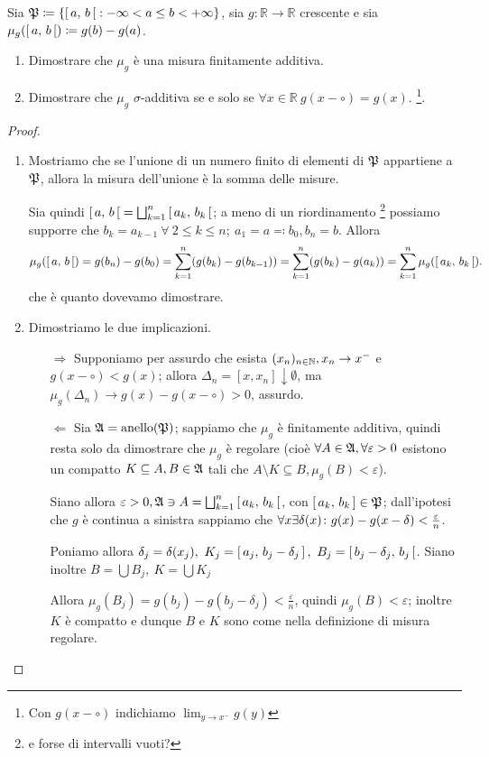 \documentclass[../EserciziIstituzioniAnalisi.tex]{subfiles}
\begin{document}
\begin{exercise}[2016-10-14]
  Sia $\mathfrak P \coloneqq \left\lbrace \left[\,a,\,b\,\right[: -\infty < a \leq b < +\infty\right\rbrace$, sia $g\colon \mathbb{R} \to \mathbb{R}$ crescente e sia $\mu_g(\left[\,a,\,b\,\right[) \coloneqq g(b) - g(a)$.
  \begin{enumerate}
    \item Dimostrare che $\mu_g$ è una misura finitamente additiva.
    \item Dimostrare che $\mu_g$ $\sigma$-additiva se e solo se $\forall x \in \mathbb{R}\ g(x-\circ) = g(x)$. \footnote{Con $g(x-\circ)$ indichiamo $\lim_{y\to x^{-}}g(y)$}.
  \end{enumerate}
\end{exercise}
\begin{proof}
  \begin{enumerate}
    \item Mostriamo che se l'unione di un numero finito di elementi di $\mathfrak P$ appartiene a $\mathfrak P$, allora la misura dell'unione è la somma delle misure.

    Sia quindi $\left[\,a,\,b\,\right[=\bigsqcup_{k=1}^{n}\left[\,a_k,\,b_k\,\right[$; a meno di un riordinamento \footnote{e forse di intervalli vuoti?} possiamo supporre che
    $b_k=a_{k-1}\ \forall\ 2\leq k\leq n;\ a_1=a\eqqcolon b_0, b_n=b$. Allora
    \begin{equation*}
      \mu_g(\left[\,a,\,b\,\right[)=g(b_n)-g(b_0)=\sum_{k=1}^n (g(b_k)-g(b_{k-1}))=\sum_{k=1}^n (g(b_k)-g(a_k))=\sum_{k=1}^n \mu_g(\left[\,a_k,\,b_k\,\right[).
    \end{equation*}
    che è quanto dovevamo dimostrare.
    \item Dimostriamo le due implicazioni.
    \begin{enumerate}
      \item[$\Rightarrow$] Supponiamo per assurdo che esista $(x_n)_{n\in \mathbb N}, x_n \rightarrow x^-$ e $g(x-\circ) < g(x)$; allora $\Delta_n=[x,x_n]\downarrow\emptyset$, ma $\mu_g(\Delta_n) \rightarrow g(x)-g(x-\circ)>0$, assurdo. 
      \item[$\Leftarrow$] Sia $\mathfrak A=\operatorname{anello}(\mathfrak P)$; sappiamo che $\mu_g$ è finitamente additiva, quindi resta solo da dimostrare che $\mu_g$ è regolare (cioè $\forall A\in \mathfrak A, \forall \varepsilon>0$ esistono un compatto $K \subseteq A, B \in \mathfrak A$ tali che $A\setminus K\subseteq B, \mu_g(B)<\varepsilon$).

      Siano allora $\varepsilon>0, \mathfrak A\ni A=\bigsqcup_{k=1}^n\left[\,a_k,\,b_k\,\right[$, con $\left[\,a_k,\,b_k\,\right]\in \mathfrak P$; dall'ipotesi che $g$ è continua a sinistra sappiamo che $\forall x \exists \delta(x) \colon g(x)-g(x-\delta)<\frac{\varepsilon}{n}$.

      Poniamo allora $\delta_j=\delta(x_j),\ K_j=\icc{a_j}{b_j-\delta_j},\ B_j=\ico{b_j-\delta_j}{b_j}$. Siano inoltre $B=\bigcup B_j,\ K=\bigcup K_j$

      Allora $\mu_g(B_j)=g(b_j)-g(b_j-\delta_j)<\frac{\varepsilon}{n}$, quindi $\mu_g(B)<\varepsilon$; inoltre $K$ è compatto e dunque $B$ e $K$ sono come nella definizione di misura regolare.
    \end{enumerate}

  \end{enumerate}
\end{proof}
\end{document}
